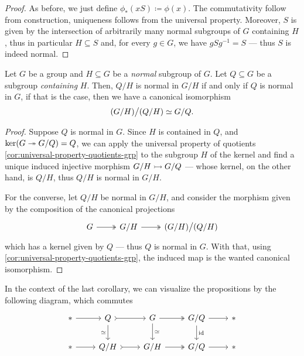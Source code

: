 \begin{proof}
As before, we just define \(\phi_{*}(x S) \coloneq \phi(x)\). The commutativity
follow from construction, uniqueness follows from the universal
property. Moreover, \(S\) is given by the intersection of arbitrarily many
normal subgroups of \(G\) containing \(H\), thus in particular \(H \subseteq S\)
and, for every \(g \in G\), we have \(g S g^{-1} = S\) --- thus \(S\) is indeed
normal.
\end{proof}

\begin{corollary}
\label{cor:quotient-isomorphism}
Let \(G\) be a group and \(H \subseteq G\) be a \emph{normal} subgroup of
\(G\). Let \(Q \subseteq G\) be a subgroup \emph{containing} \(H\). Then,
\(Q/H\) is normal in \(G/H\) if and only if \(Q\) is normal in \(G\), if that is
the case, then we have a canonical isomorphism
\[
  (G/H) \big/ (Q/H) \simeq G/Q.
\]
\end{corollary}

\begin{proof}
Suppose \(Q\) is normal in \(G\). Since \(H\) is contained in \(Q\), and \(\ker(G
\twoheadrightarrow G/Q) = Q\), we can apply the universal property of quotients
\cref{cor:universal-property-quotients-grp} to the subgroup \(H\) of the kernel
and find a unique induced injective morphism \(G/H \rightarrowtail G/Q\) --- whose kernel,
on the other hand, is \(Q/H\), thus \(Q/H\) is normal in \(G/H\).

For the converse, let \(Q/H\) be normal in \(G/H\), and consider the morphism
given by the composition of the canonical projections
\[
  \begin{tikzcd}
    G \ar[r, two heads] &G/H \ar[r, two heads] &(G/H) \big/ (Q/H)
  \end{tikzcd}
\]
which has a kernel given by \(Q\) --- thus \(Q\) is normal in \(G\). With that,
using \cref{cor:universal-property-quotients-grp}, the induced map is the wanted
canonical isomorphism.
\end{proof}

In the context of the last corollary, we can visualize the propositions by the
following diagram, which commutes
\[
  \begin{tikzcd}
    * \ar[r] &Q \ar[r, tail] \ar[d, "\iso"']
    &G \ar[r, two heads] \ar[d, "\iso"]
    &G/Q \ar[r] \ar[d, "\Id"] &*
    \\
    * \ar[r] &Q/H \ar[r, tail] &G/H \ar[r, two heads] &G/Q \ar[r] &*
  \end{tikzcd}
\]

